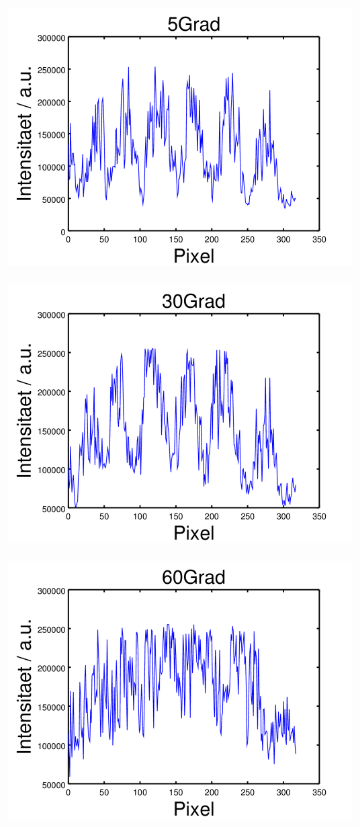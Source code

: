 \documentclass[numbers=noenddot,a4paper,notitlepage,twoside,BCOR15mm]{scrartcl}
\begin{document}
	
	\begin{figure}
		\centering
		\begin{subfigure}{.49\textwidth}
			\centering
			\includegraphics[width=0.75\linewidth]{pics/5grad.png}
		\end{subfigure}
		\begin{subfigure}{.49\textwidth}
			\centering
			\includegraphics[width=0.75\linewidth]{pics/30grad.png}
		\end{subfigure}
		\begin{subfigure}{.49\textwidth}
			\centering
			\includegraphics[width=0.75\linewidth]{pics/60grad.png}

\end{subfigure}
\end{figure}
\end{document}
